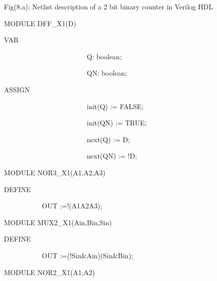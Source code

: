 \documentclass[a4paper]{article}
\begin{document}
\bigskip


\bigskip


\bigskip


\bigskip

{\centering\ttfamily\color[rgb]{0.0,0.0,0.039215688}
\textrm{Fig(8.a): Netlist description of a 2 bit binary counter in
Verilog HDL}
\par}


\bigskip



\begin{center}
\begin{minipage}{6.06667in}
{\ttfamily\color[rgb]{0.0,0.0,0.039215688}
MODULE DFF\_X1(D)}

{\ttfamily\color[rgb]{0.0,0.0,0.039215688}
VAR}

{\ttfamily\color[rgb]{0.0,0.0,0.039215688}
\ \ \ \ \ \ \ \ \ \ \ \ \ \ \ \ \ \ \ \ \ \ \ \ Q: boolean;}

{\ttfamily\color[rgb]{0.0,0.0,0.039215688}
\ \ \ \ \ \ \ \ \ \ \ \ \ \ \ \ \ \ \ \ \ \ \ \ QN: boolean;}

{\ttfamily\color[rgb]{0.0,0.0,0.039215688}
ASSIGN}

{\ttfamily\color[rgb]{0.0,0.0,0.039215688}
\ \ \ \ \ \ \ \ \ \ \ \ \ \ \ \ \ \ \ \ \ \ \ \ init(Q) := FALSE;}

{\ttfamily\color[rgb]{0.0,0.0,0.039215688}
\ \ \ \ \ \ \ \ \ \ \ \ \ \ \ \ \ \ \ \ \ \ \ \ init(QN) := TRUE;}

{\ttfamily\color[rgb]{0.0,0.0,0.039215688}
\ \ \ \ \ \ \ \ \ \ \ \ \ \ \ \ \ \ \ \ \ \ \ \ next(Q) := D;}

{\ttfamily\color[rgb]{0.0,0.0,0.039215688}
\ \ \ \ \ \ \ \ \ \ \ \ \ \ \ \ \ \ \ \ \ \ \ \ next(QN) := !D;}

{\ttfamily\color[rgb]{0.0,0.0,0.039215688}
MODULE NOR3\_X1(A1,A2,A3)}

{\ttfamily\color[rgb]{0.0,0.0,0.039215688}
DEFINE}

{\ttfamily\color[rgb]{0.0,0.0,0.039215688}
\ \ \ \ \ \ \ \ \ \ \ OUT :=!(A1{\textbar}A2{\textbar}A3);}

{\ttfamily\color[rgb]{0.0,0.0,0.039215688}
MODULE MUX2\_X1(Ain,Bin,Sin)}

{\ttfamily\color[rgb]{0.0,0.0,0.039215688}
DEFINE}

{\ttfamily\color[rgb]{0.0,0.0,0.039215688}
\ \ \ \ \ \ \ \ \ \ \ OUT :=(!Sin\&Ain){\textbar}(Sin\&Bin);}

{\ttfamily\color[rgb]{0.0,0.0,0.039215688}
MODULE NOR2\_X1(A1,A2)}


\end{minipage}
\end{center}
\end{document}
